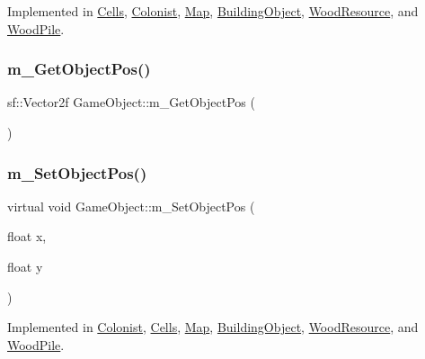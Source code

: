 Implemented in \mbox{\hyperlink{class_cells_a09ab1aeac5c986cc28f52754fafd8c66}{Cells}}, \mbox{\hyperlink{class_colonist_ae7d7c74ff639334e6992142c01dd8f6f}{Colonist}}, \mbox{\hyperlink{class_map_aa65945c61f28808b549a264a3b87219e}{Map}}, \mbox{\hyperlink{class_building_object_a7e343d32ad1f6aaed5ed484b2aabe700}{Building\+Object}}, \mbox{\hyperlink{class_wood_resource_a8f2336619be4467ba0eba87ded7b7474}{Wood\+Resource}}, and \mbox{\hyperlink{class_wood_pile_aacdd6153eacdeaf06cddf83cca50da03}{Wood\+Pile}}.

\mbox{\label{class_game_object_a3ab12f6c943557e7ab6d9f56f4bb4953}} 
\subsubsection{\texorpdfstring{m\+\_\+\+Get\+Object\+Pos()}{m\_GetObjectPos()}}
{\footnotesize\ttfamily sf\+::\+Vector2f Game\+Object\+::m\+\_\+\+Get\+Object\+Pos (\begin{DoxyParamCaption}{ }\end{DoxyParamCaption})}

\mbox{\label{class_game_object_ad1f8ea8eb3673b1af8215bf92cdc0df8}} 
\subsubsection{\texorpdfstring{m\+\_\+\+Set\+Object\+Pos()}{m\_SetObjectPos()}}
{\footnotesize\ttfamily virtual void Game\+Object\+::m\+\_\+\+Set\+Object\+Pos (\begin{DoxyParamCaption}\item[{float}]{x,  }\item[{float}]{y }\end{DoxyParamCaption})\hspace{0.3cm}{\ttfamily [pure virtual]}}



Implemented in \mbox{\hyperlink{class_colonist_a4dd53225a89bab611509a4d8fc0c2fb1}{Colonist}}, \mbox{\hyperlink{class_cells_a5d900205d8d5fc3d3b41b664d51994c4}{Cells}}, \mbox{\hyperlink{class_map_aa44fadcea160127a186720c1ff44e533}{Map}}, \mbox{\hyperlink{class_building_object_aa6239662e4277d8e1933f9c8fd487511}{Building\+Object}}, \mbox{\hyperlink{class_wood_resource_afa9f748e3dea5f08c18dd831f04d9287}{Wood\+Resource}}, and \mbox{\hyperlink{class_wood_pile_a8faa580584607dea772076b7d856daf8}{Wood\+Pile}}.


